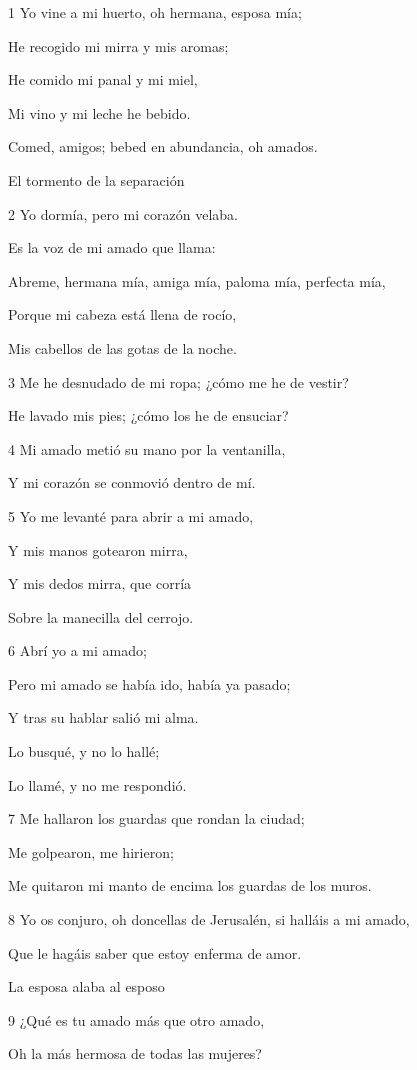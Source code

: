\par 1 Yo vine a mi huerto, oh hermana, esposa mía;
\par He recogido mi mirra y mis aromas;
\par He comido mi panal y mi miel,
\par Mi vino y mi leche he bebido.
\par Comed, amigos; bebed en abundancia, oh amados.
\par El tormento de la separación
\par 2 Yo dormía, pero mi corazón velaba.
\par Es la voz de mi amado que llama:
\par Abreme, hermana mía, amiga mía, paloma mía, perfecta mía,
\par Porque mi cabeza está llena de rocío,
\par Mis cabellos de las gotas de la noche.
\par 3 Me he desnudado de mi ropa; ¿cómo me he de vestir?
\par He lavado mis pies; ¿cómo los he de ensuciar?
\par 4 Mi amado metió su mano por la ventanilla,
\par Y mi corazón se conmovió dentro de mí.
\par 5 Yo me levanté para abrir a mi amado,
\par Y mis manos gotearon mirra,
\par Y mis dedos mirra, que corría
\par Sobre la manecilla del cerrojo.
\par 6 Abrí yo a mi amado;
\par Pero mi amado se había ido, había ya pasado;
\par Y tras su hablar salió mi alma.
\par Lo busqué, y no lo hallé;
\par Lo llamé, y no me respondió.
\par 7 Me hallaron los guardas que rondan la ciudad;
\par Me golpearon, me hirieron;
\par Me quitaron mi manto de encima los guardas de los muros.
\par 8 Yo os conjuro, oh doncellas de Jerusalén, si halláis a mi amado,
\par Que le hagáis saber que estoy enferma de amor.
\par La esposa alaba al esposo
\par 9 ¿Qué es tu amado más que otro amado,
\par Oh la más hermosa de todas las mujeres?
